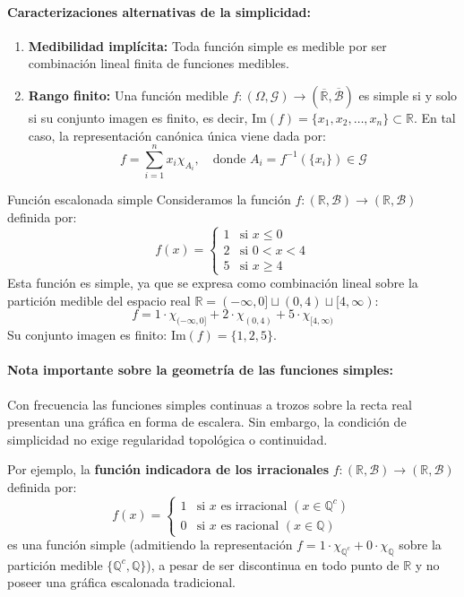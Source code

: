 \paragraph{Caracterizaciones alternativas de la simplicidad:}
\begin{enumerate}[label=\arabic*.]
    \item \textbf{Medibilidad implícita:} Toda función simple es medible por ser combinación lineal finita de funciones medibles.
    \item \textbf{Rango finito:} Una función medible $f : (\Omega, \mathcal{G}) \to (\overline{\mathbb{R}}, \overline{\mathcal{B}})$ es simple si y solo si su conjunto imagen es finito, es decir, $\mathrm{Im}(f) = \{x_1, x_2, \dots, x_n\} \subset \mathbb{R}$. En tal caso, la representación canónica única viene dada por:
    \[
        f = \sum_{i=1}^n x_i \chi_{A_i}, \quad \text{donde } A_i = f^{-1}(\{x_i\}) \in \mathcal{G}
    \]
\end{enumerate}

\begin{ejemplo}{Función escalonada simple}
Consideramos la función $f : (\mathbb{R}, \mathcal{B}) \to (\mathbb{R}, \mathcal{B})$ definida por:
\[
    f(x) = \begin{cases}
        1 & \text{si } x \le 0 \\[4pt]
        2 & \text{si } 0 < x < 4 \\[4pt]
        5 & \text{si } x \ge 4
    \end{cases}
\]
Esta función es simple, ya que se expresa como combinación lineal sobre la partición medible del espacio real $\mathbb{R} = (-\infty, 0] \sqcup (0, 4) \sqcup [4, \infty)$:
\[
    f = 1 \cdot \chi_{(-\infty, 0]} + 2 \cdot \chi_{(0, 4)} + 5 \cdot \chi_{[4, \infty)}
\]
Su conjunto imagen es finito: $\mathrm{Im}(f) = \{1, 2, 5\}$.
\end{ejemplo}

\paragraph{Nota importante sobre la geometría de las funciones simples:}
Con frecuencia las funciones simples continuas a trozos sobre la recta real presentan una gráfica en forma de escalera. Sin embargo, la condición de simplicidad no exige regularidad topológica o continuidad.

Por ejemplo, la \textbf{función indicadora de los irracionales} $f : (\mathbb{R}, \mathcal{B}) \to (\mathbb{R}, \mathcal{B})$ definida por:
\[
    f(x) = \begin{cases}
        1 & \text{si } x \text{ es irracional } (x \in \mathbb{Q}^c) \\[4pt]
        0 & \text{si } x \text{ es racional } (x \in \mathbb{Q})
    \end{cases}
\]
es una función simple (admitiendo la representación $f = 1 \cdot \chi_{\mathbb{Q}^c} + 0 \cdot \chi_{\mathbb{Q}}$ sobre la partición medible $\{\mathbb{Q}^c, \mathbb{Q}\}$), a pesar de ser discontinua en todo punto de $\mathbb{R}$ y no poseer una gráfica escalonada tradicional.

